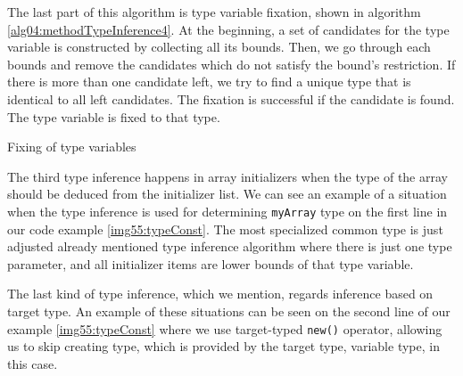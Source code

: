 \par
{}
The last part of this algorithm is type variable fixation, shown in algorithm  \ref{alg04:methodTypeInference4}.
At the beginning, a set of candidates for the type variable is constructed by collecting all its bounds. 
Then, we go through each bounds and remove the candidates which do not satisfy the bound’s restriction. 
If there is more than one candidate left, we try to find a unique type that is identical to all left candidates.
The fixation is successful if the candidate is found.
The type variable is fixed to that type.
\par
\begin{algorithm}

\caption{Fixing of type variables}
\label{alg04:methodTypeInference4}
\end{algorithm}
The third type inference happens in array initializers when the type of the array should be deduced from the initializer list.
We can see an example of a situation when the type inference is used for determining \texttt{myArray} type on the first line in our code example \ref{img55:typeConst}.
The most specialized common type is just adjusted already mentioned type inference algorithm where there is just one type parameter, and all initializer items are lower bounds of that type variable.
\par
{}
The last kind of type inference, which we mention, regards inference based on target type.
An example of these situations can be seen on the second line of our example \ref{img55:typeConst} where we use target-typed \texttt{new()} operator, allowing us to skip creating type, which is provided by the target type, variable type, in this case.

